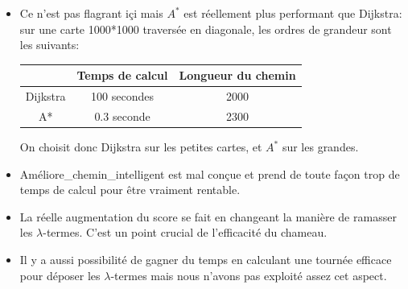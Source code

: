 \documentclass[a4paper,12pt]{article}
\begin{document}
\begin{itemize}
\item Ce n'est pas flagrant i\c ci mais $A^*$ est r\'eellement plus performant que Dijkstra: sur une carte 1000*1000 travers\'ee en diagonale, les ordres de grandeur sont les suivants:\\
\begin{center}
\begin{tabular}{|c|c|c|}
\hline
& Temps de calcul & Longueur du chemin\\
\hline
Dijkstra & 100 secondes & 2000\\
\hline
A* & 0.3 seconde & 2300\\
\hline
\end{tabular}
\end{center}
On choisit donc Dijkstra sur les petites cartes, et $A^*$ sur les grandes.
\vspace{0.5cm}
\item Am\'eliore\_chemin\_intelligent est mal con\c cue et prend de toute fa\c con trop de temps de calcul pour \^etre vraiment rentable.
\item La r\'eelle augmentation du score se fait en changeant la mani\`ere de ramasser les $\lambda$-termes. C'est un point crucial de l'efficacit\'e du chameau.
\item Il y a aussi possibilit\'e de gagner du temps en calculant une tourn\'ee efficace pour d\'eposer les $\lambda$-termes mais nous n'avons pas exploit\'e assez cet aspect.
\end{itemize}
\end{document}
